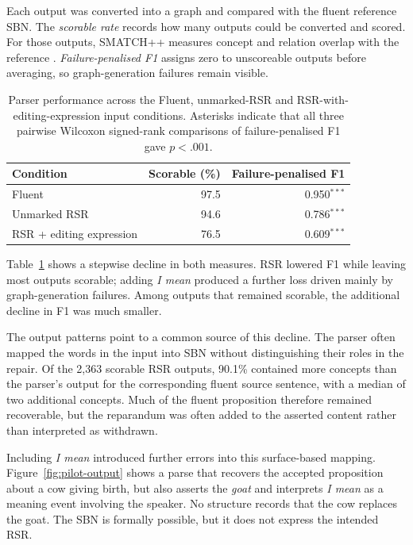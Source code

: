 Each output was converted into a graph and compared with the fluent reference
SBN. The \emph{scorable rate} records how many outputs could be converted and
scored. For those outputs, SMATCH++ measures concept and relation overlap with
the reference \citep{opitzSMATCHStandardizedExtended2023}.
\emph{Failure-penalised F1} assigns zero to unscoreable outputs before averaging,
so graph-generation failures remain visible.

\begin{table}[htbp]
\centering
\small
\begin{tabular}{lrr}
\toprule
Condition & Scorable (\%) & Failure-penalised F1 \\
\midrule
Fluent      & 97.5 & 0.950$^{***}$ \\
Unmarked RSR & 94.6 & 0.786$^{***}$ \\
RSR + editing expression & 76.5 & 0.609$^{***}$ \\
\bottomrule
\end{tabular}
\caption{Parser performance across the Fluent, unmarked-RSR and
RSR-with-editing-expression input conditions. Asterisks indicate that all
three pairwise Wilcoxon signed-rank comparisons of failure-penalised F1 gave
$p<.001$.}
\label{tab:pilot}
\end{table}

Table~\ref{tab:pilot} shows a stepwise decline in both measures.
RSR lowered F1 while leaving most outputs scorable; adding \textit{I mean}
produced a further loss driven mainly by graph-generation failures. Among
outputs that remained scorable, the additional decline in F1 was much smaller.

The output patterns point to a common source of this decline. The parser often
mapped the words in the input into SBN without distinguishing their roles in
the repair. Of the 2,363 scorable RSR outputs, 90.1\% contained more concepts
than the parser's output for the corresponding fluent source sentence, with a median
of two additional concepts. Much of the fluent proposition therefore remained
recoverable, but the reparandum was often added to the asserted content rather
than interpreted as withdrawn.

Including \textit{I mean} introduced further errors into this surface-based
mapping.
Figure~\ref{fig:pilot-output} shows a parse that recovers the accepted
proposition about a cow giving birth, but also asserts the \textit{goat} and
interprets \textit{I mean} as a meaning event involving the speaker. No
structure records that the cow replaces the goat. The SBN is formally
possible, but it does not express the intended RSR.



